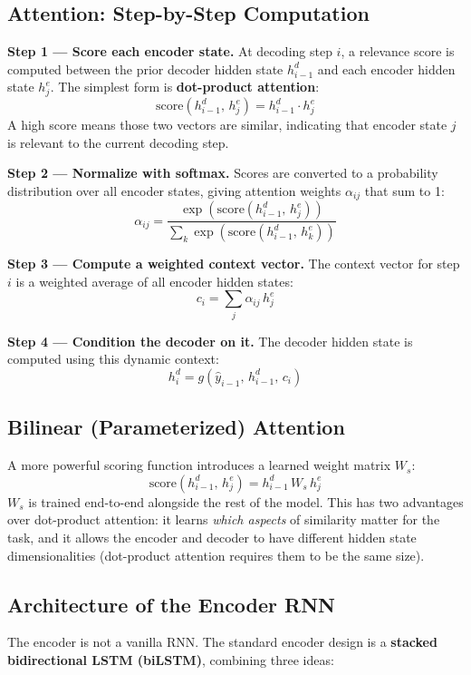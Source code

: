 \subsection{Attention: Step-by-Step Computation}

\textbf{Step 1 --- Score each encoder state.}
At decoding step $i$, a relevance score is computed between the prior decoder hidden state
$h_{i-1}^d$ and each encoder hidden state $h_j^e$. The simplest form is
\textbf{dot-product attention}:
\[
    \text{score}(h_{i-1}^d,\, h_j^e) = h_{i-1}^d \cdot h_j^e
\]
A high score means those two vectors are similar, indicating that encoder state $j$ is
relevant to the current decoding step.

\textbf{Step 2 --- Normalize with softmax.}
Scores are converted to a probability distribution over all encoder states, giving
attention weights $\alpha_{ij}$ that sum to 1:
\[
    \alpha_{ij} = \frac{\exp(\text{score}(h_{i-1}^d,\, h_j^e))}
                       {\sum_k \exp(\text{score}(h_{i-1}^d,\, h_k^e))}
\]

\textbf{Step 3 --- Compute a weighted context vector.}
The context vector for step $i$ is a weighted average of all encoder hidden states:
\[
    c_i = \sum_j \alpha_{ij}\, h_j^e
\]

\textbf{Step 4 --- Condition the decoder on it.}
The decoder hidden state is computed using this dynamic context:
\[
    h_i^d = g(\hat{y}_{i-1},\, h_{i-1}^d,\, c_i)
\]

\subsection{Bilinear (Parameterized) Attention}

A more powerful scoring function introduces a learned weight matrix $W_s$:
\[
    \text{score}(h_{i-1}^d,\, h_j^e) = h_{i-1}^d\, W_s\, h_j^e
\]
$W_s$ is trained end-to-end alongside the rest of the model. This has two advantages
over dot-product attention: it learns \textit{which aspects} of similarity matter for the
task, and it allows the encoder and decoder to have different hidden state dimensionalities
(dot-product attention requires them to be the same size).

\subsection{Architecture of the Encoder RNN}

The encoder is not a vanilla RNN. The standard encoder design is a \textbf{stacked
bidirectional LSTM (biLSTM)}, combining three ideas:

